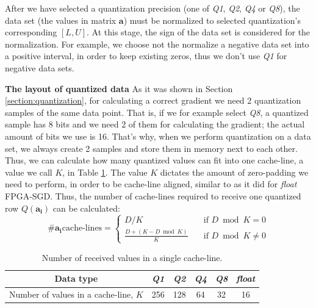 \documentclass{article}
\begin{document}
After we have selected a quantization precision (one of \textit{Q1}, \textit{Q2}, \textit{Q4} or \textit{Q8}), the data set (the values in matrix $\mathbf{a}$) must be normalized to selected quantization's corresponding $[L,U]$. At this stage, the sign of the data set is considered for the normalization. For example, we choose not the normalize a negative data set into a positive interval, in order to keep existing zeros, thus we don't use \textit{Q1} for negative data sets.

\noindent
\textbf{The layout of quantized data} As it was shown in Section \ref{section:quantization}, for calculating a correct gradient we need 2 quantization samples of the same data point. That is, if we for example select \textit{Q8}, a quantized sample has 8 bits and we need 2 of them for calculating the gradient; the actual amount of bits we use is 16. That's why, when we perform quantization on a data set, we always create 2 samples and store them in memory next to each other. Thus, we can calculate how many quantized values can fit into one cache-line, a value we call $K$, in Table \ref{table:valuesincl}. The value $K$ dictates the amount of zero-padding we need to perform, in order to be cache-line aligned, similar to as it did for \textit{float} FPGA-SGD. Thus, the number of cache-lines required to receive one quantized row $Q(\mathbf{a_i})$ can be calculated:
\begin{equation}
\label{equation:cachelines}
\text{\#} \mathbf{a_i} \text{cache-lines} = 
\begin{cases}
D/K
\quad & \text{if } D\bmod K=0 \\
\frac{D + (K-D\bmod K)}{K}
\quad & \text{if } D\bmod K\neq0
\end{cases}
\end{equation}
\begin{table}[t]
\centering
\caption{Number of received values in a single cache-line.}
\label{table:valuesincl}
\begin{tabular}{c|c|c|c|c|c}
Data type & \textit{Q1} & \textit{Q2} & \textit{Q4} & \textit{Q8} & \textit{float}\\
\hline
Number of values in a cache-line, $K$ & 256 & 128 & 64 & 32 & 16\\
\end{tabular}
\end{table}
\end{document}
